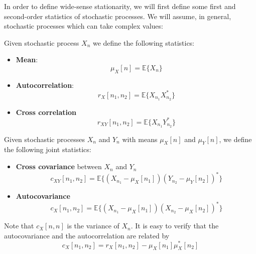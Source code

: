 In order to define wide-sense stationarity, we will first define some first and second-order statistics of stochastic processes. We will assume, in general, stochastic processes which can take complex values:


\begin{definition}
Given stochastic process $X_n$ we define the following statistics:

\begin{itemize}
\item \textbf{Mean}:
\begin{equation}\label{ec:DefMediaProcCont}
  \mu_X[n] = \mathbb{E}\{X_n\}
\end{equation}
\item \textbf{Autocorrelation}:
\begin{equation}
r_X[n_1,n_2] = \mathbb{E}\{X_{n_1}X^*_{n_2}\}
\label{ec:autocorr}
\end{equation}
\item \textbf{Cross correlation}
\begin{equation}
r_{XY}[n_1,n_2] = \mathbb{E}\{X_{n_1}Y^*_{n_2}\}
\end{equation}
\end{itemize}

Given stochastic processes $X_n$ and $Y_n$ with means $\mu_X[n]$ and $\mu_Y[n]$, we define the following joint statistics:
\begin{itemize}
\item \textbf{Cross covariance} between $X_n$ and $Y_n$
\begin{equation}
c_{XY}[n_1,n_2] = \mathbb{E}\{(X_{n_1}- \mu_X[n_1]) (Y_{n_2}-\mu_Y[n_2])^*\}
\end{equation}
\item \textbf{Autocovariance}
\begin{equation}
c_X[n_1,n_2] = \mathbb{E}\{(X_{n_1}- \mu_X[n_1]) (X_{n_2}- \mu_X[n_2])^*\}
\end{equation}
\end{itemize}
\end{definition}

Note that $c_X[n, n]$ is the variance of $X_n$. It is easy to verify that the autocovariance and the autocorrelation are related by
\begin{equation}
c_X[n_1,n_2] = r_X[n_1,n_2] - \mu_X[n_1] \mu_X^*[n_2]
\label{SP:cx_vs_rx}
\end{equation}

